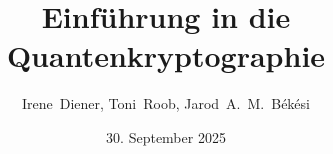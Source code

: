 %
%
\author[Diener, Roob, B{\'e}k{\'e}si]
{Irene~Diener, Toni~Roob, Jarod~A.~M.~B{\'e}k{\'e}si}
\newcommand{\myTitle}{Einf{\"u}hrung in die Quantenkryptographie}
\newcommand{\myTitleShort}{Quantenkryptographie}
\title[\myTitleShort]{\myTitle}
\newcommand{\myProf}{Prof.~Dr.~habil.~Andriy~Luntovskyy}
\newcommand{\myAcademy}{Duale Hochschule Sachsen}
\newcommand{\myStudy}{Studiengang Informationstechnik}
\newcommand{\myLocation}{Dresden} 
\newcommand{\myVersion}{Version 1.0}
\newcommand{\mySubmissionDate}{30. September 2025}


%
%
\usepackage[latin1]{inputenc}
\usepackage[T1]{fontenc}
\usepackage{lmodern}


%
%
\date{\mySubmissionDate}


